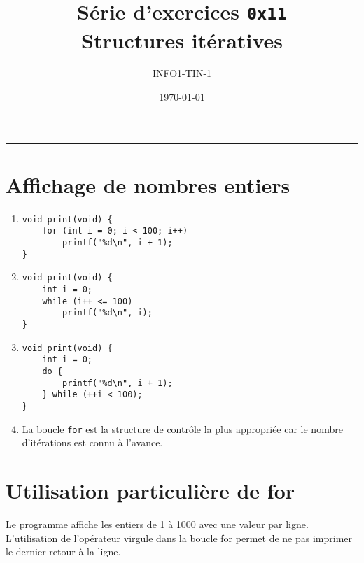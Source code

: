 



\date{\today}
\author{INFO1-TIN-1}
\title{Série d'exercices \texttt{0x11} \\ \textbf{Structures itératives}}
\maketitle

\noindent\rule{\textwidth}{.3pt}

\begin{multicols}{2}

\section{Affichage de nombres entiers}

\begin{enumerate}[label=(\roman*)]

\item \begin{lstlisting}
void print(void) {
    for (int i = 0; i < 100; i++)
        printf("%d\n", i + 1);
}
\end{lstlisting}

\item \begin{lstlisting}
void print(void) {
    int i = 0;
    while (i++ <= 100)
        printf("%d\n", i);
}
\end{lstlisting}

\item \begin{lstlisting}
void print(void) {
    int i = 0;
    do {
        printf("%d\n", i + 1);
    } while (++i < 100);
}
\end{lstlisting}

\item La boucle \lstinline{for} est la structure de contrôle la plus appropriée car le nombre d'itérations est connu à l'avance.

\end{enumerate}

\section{Utilisation particulière de for}

Le programme affiche les entiers de 1 à 1000 avec une valeur par ligne. L'utilisation de l'opérateur virgule dans la boucle for permet de ne pas imprimer le dernier retour à la ligne.


\end{multicols}
